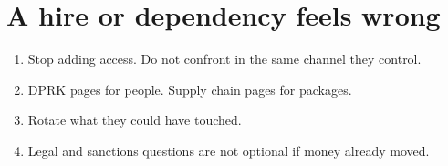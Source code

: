 \section{A hire or dependency feels wrong}

\begin{enumerate}
  \item Stop adding access. Do not confront in the same
  channel they control.
  \item DPRK pages for people. Supply chain pages for
  packages.
  \item Rotate what they could have touched.
  \item Legal and sanctions questions are not optional
  if money already moved.
\end{enumerate}
